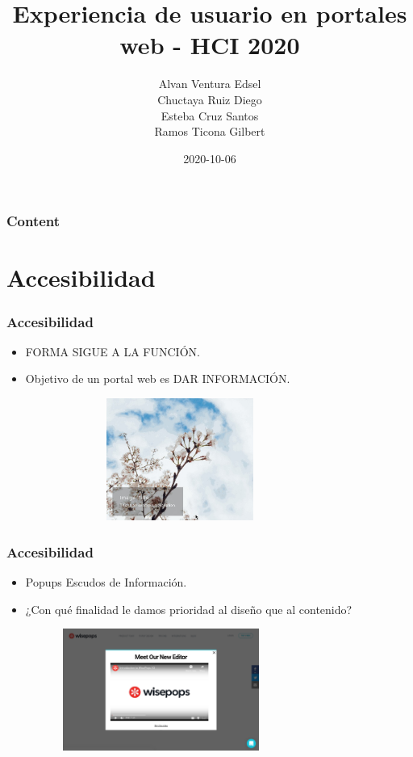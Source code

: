 \documentclass[11pt]{beamer}
\title[Experiencia de usuario en portales web]{\bf\Huge Experiencia de usuario en portales web - HCI 2020  }
\author[]
{
    Alvan Ventura Edsel\inst{1}\\
	Chuctaya Ruiz Diego \inst{2}\\
	Esteba Cruz Santos \inst{3}\\
	Ramos Ticona Gilbert\inst{4}
}
\institute[UNSA]
{
\inst{1}%
System Engineering School\\
}
\date[2020-10-06]{\scriptsize{2020-10-06}}
\begin{document}
    \begin{frame}
    \titlepage
    \end{frame}
    
    
    \begin{frame}
    \frametitle{Content}
    \tableofcontents
    \end{frame}
    
    \section{Accesibilidad}
    \begin{frame}
    \frametitle{Accesibilidad}
    \begin{itemize}
     \item FORMA SIGUE A LA FUNCIÓN.
     \item Objetivo de un portal web es DAR INFORMACIÓN.
    \begin{figure}[t]
    \includegraphics[width=8cm, height=4cm]{over.jpg}
    \centering
    \end{figure}
    \end{itemize}
    \end{frame}
    
    \begin{frame}
    \frametitle{Accesibilidad}
    \begin{itemize}
     \item Popups Escudos de Información.
     \item ¿Con qué finalidad le damos prioridad al diseño que al contenido?
     \end{itemize}
     
     \begin{figure}[t]
    \includegraphics[width=8cm, height=4cm]{pop.png}
    \centering
    \end{figure}
    \end{frame}
    
\end{document}

